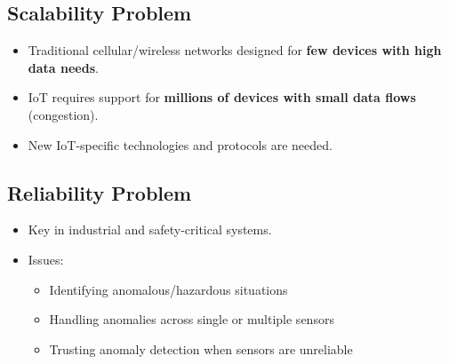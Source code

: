 \subsection{Scalability Problem}
\begin{itemize}
    \item Traditional cellular/wireless networks designed for \textbf{few devices with high data needs}.
    \item IoT requires support for \textbf{millions of devices with small data flows} (congestion).
    \item New IoT-specific technologies and protocols are needed.
\end{itemize}

\subsection{Reliability Problem}
\begin{itemize}
    \item Key in industrial and safety-critical systems.
    \item Issues:
    \begin{itemize}
        \item Identifying anomalous/hazardous situations
        \item Handling anomalies across single or multiple sensors
        \item Trusting anomaly detection when sensors are unreliable
    \end{itemize}
\end{itemize}
